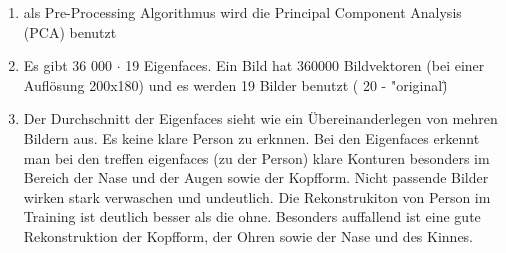 \begin{enumerate}
	\item als Pre-Processing Algorithmus wird die Principal Component Analysis (PCA) benutzt
	\item Es gibt 36 000 $ \cdot $ 19 Eigenfaces. Ein Bild hat 360000 Bildvektoren (bei einer Auflösung 200x180) und es werden 19 Bilder benutzt ( 20 - "original\")
	\item Der Durchschnitt der Eigenfaces sieht wie ein Übereinanderlegen von mehren  Bildern aus. Es keine klare Person zu erknnen. Bei den Eigenfaces erkennt man bei den treffen eigenfaces (zu der Person) klare Konturen besonders im Bereich der Nase und der Augen sowie der Kopfform. Nicht passende Bilder wirken stark verwaschen und undeutlich.
Die Rekonstrukiton von Person im Training ist deutlich besser als die ohne. Besonders auffallend ist eine gute Rekonstruktion der Kopfform, der Ohren sowie der Nase und des Kinnes.
\end{enumerate}
